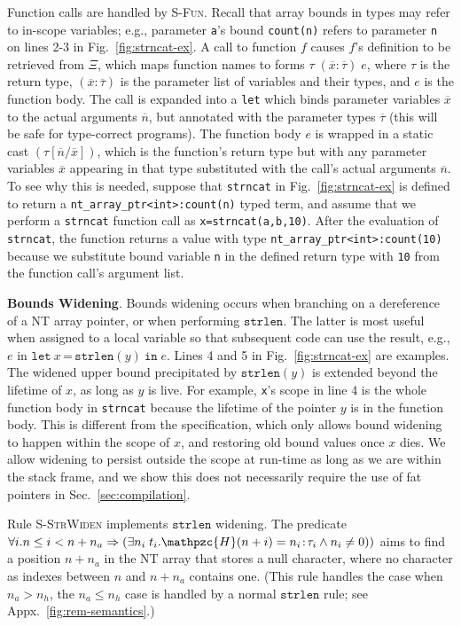 \documentclass[conference]{IEEEtran}
\newcommand{\myparagraph}[1]{\textbf{#1}.\xspace}
\newcommand{\code}[1]{\lstinline|#1|}
\newcommand{\checkedc}{\text{Checked C}\xspace}
\newcommand{\kw}[1]{\ensuremath{\mathtt{#1}}}
\newcommand{\estrlen}[1]{\ensuremath{\kw{strlen}({#1})}}
\newcommand{\estrlentext}{\ensuremath{\kw{strlen}}}
\newcommand{\evalue}[2]{\ensuremath{{#1}\!:\!{#2}}}
\newcommand{\elet}[3]{\ensuremath{\kw{let}~#1\, \texttt{=}\, #2~\kw{in}\;{#3}}}
\newcommand{\heap}{\ensuremath{\mathpzc{H}}}
\begin{document}
Function calls are handled by \textsc{S-Fun}. Recall that array
bounds in types may refer to in-scope variables; e.g., parameter
\code{a}'s bound \code{count(n)} refers to parameter \code{n} on lines
2-3 in Fig.~\ref{fig:strncat-ex}. A call to function $f$ causes $f$'s
definition to be retrieved from $\Xi$, which maps function names to
forms $\tau\;(\evalue{\overline{x}}{\overline{\tau}})\;e$, where
$\tau$ is the return type, $(\evalue{\overline{x}}{\overline{\tau}})$
is the parameter list of variables and their types, and $e$ is the
function body. The call is expanded into a \texttt{let} which binds
parameter variables $\overline{x}$ to the actual arguments
$\overline{n}$, but annotated with the parameter types
$\overline{\tau}$ (this will be safe for type-correct programs). The
function body $e$ is wrapped in a static cast
$(\tau[\overline{n} / \overline{x}])$, which is the function's return
type but with any parameter variables $\overline{x}$ appearing in that
type substituted with the call's actual arguments $\overline{n}$. To
see why this is needed, suppose that \code{strncat} in
Fig.~\ref{fig:strncat-ex} is defined to return a
\code{nt_array_ptr<int>:count(n)} typed term, and assume that we
perform a \code{strncat} function call as
\code{x=strncat(a,b,10)}. After the evaluation of \code{strncat}, the
function returns a value with type \code{nt_array_ptr<int>:count(10)}
because we substitute bound variable \code{n} in the 
defined return type with \code{10} from the function call's
argument list.

\myparagraph{Bounds Widening}
Bounds widening occurs when branching on a dereference of a NT array
pointer, or when performing $\estrlentext$. The latter is most useful
when assigned to a local variable so that subsequent code can use the
result, e.g., $e$ in $\elet{x}{\estrlen{y}}{e}$.  Lines 4 and 5 in
Fig.~\ref{fig:strncat-ex} are examples. 
The widened upper bound
precipitated by $\estrlen{y}$ is extended beyond the lifetime of $x$, as long as $y$ is live.
For example, \code{x}'s scope in line 4 is
the whole function body in \code{strncat} because the lifetime of the pointer $y$ is in the function body.
This is different from the \checkedc specification, 
which only allows bound widening to happen within the scope of $x$, and restoring old bound values once $x$ dies.
We allow widening to persist outside the scope at run-time as long as
we are within the stack frame, and we show
this does not necessarily require the use of fat pointers in
Sec.~\ref{sec:compilation}.

Rule \textsc{S-StrWiden} implements $\estrlentext$ widening. The
predicate
$\forall i. n \le i < n+n_a \Rightarrow (\exists n_i\;t_i. \heap(n+i)
= \evalue{n_i}{\tau_i} \wedge n_i \neq 0))$ aims to find a position
$n+n_a$ in the NT array that stores a null character, where no
character as indexes between $n$ and $n+n_a$ contains one. (This rule
handles the case when $n_a > n_h$, the $n_a \le n_h$ case is handled
by a normal $\estrlentext$ rule; see Appx.~\ref{fig:rem-semantics}.) 
\end{document}
